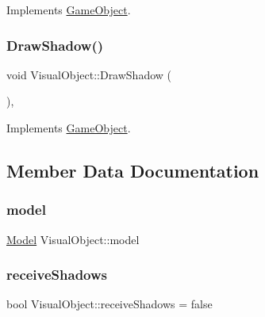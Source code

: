 Implements \mbox{\hyperlink{class_game_object_a29a665f46fda87982825bc5c0ca6a888}{Game\+Object}}.

\mbox{\label{class_visual_object_a88e778dc97ad93cefd5193d6899d6c82}} 
\subsubsection{\texorpdfstring{DrawShadow()}{DrawShadow()}}
{\footnotesize\ttfamily void Visual\+Object\+::\+Draw\+Shadow (\begin{DoxyParamCaption}{ }\end{DoxyParamCaption})\hspace{0.3cm}{\ttfamily [override]}, {\ttfamily [virtual]}}



Implements \mbox{\hyperlink{class_game_object_a78bf45c8ef3805247435583556087788}{Game\+Object}}.



\subsection{Member Data Documentation}
\mbox{\label{class_visual_object_a325fec77ff1a5441f1ff4ffa98e508c8}} 
\subsubsection{\texorpdfstring{model}{model}}
{\footnotesize\ttfamily \mbox{\hyperlink{class_model}{Model}} Visual\+Object\+::model}

\mbox{\label{class_visual_object_af54b3c823b3ca24736faeedc88ef90f3}} 
\subsubsection{\texorpdfstring{receiveShadows}{receiveShadows}}
{\footnotesize\ttfamily bool Visual\+Object\+::receive\+Shadows = false}

\mbox{\label{class_visual_object_ae07ac7780e0fca78a7c61c364fa1bf05}} 
